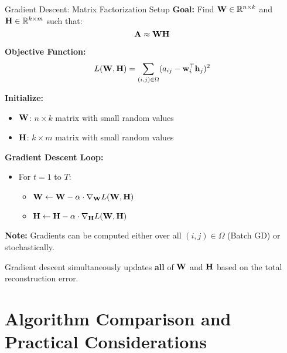 \documentclass{beamer}
\begin{document}
\begin{frame}{Gradient Descent: Matrix Factorization Setup}
\textbf{Goal:} Find $\mathbf{W} \in \mathbb{R}^{n \times k}$ and $\mathbf{H} \in \mathbb{R}^{k \times m}$ such that:
\[
\mathbf{A} \approx \mathbf{W} \mathbf{H}
\]

\vspace{0.5em}
\textbf{Objective Function:}
\[
L(\mathbf{W}, \mathbf{H}) = \sum_{(i,j) \in \Omega} (a_{ij} - \mathbf{w}_i^\top \mathbf{h}_j)^2
\]

\pause
\textbf{Initialize:}
\begin{itemize}
  \item $\mathbf{W}$: $n \times k$ matrix with small random values
  \item $\mathbf{H}$: $k \times m$ matrix with small random values
\end{itemize}

\pause
\textbf{Gradient Descent Loop:}
\begin{itemize}
  \item For $t = 1$ to $T$:
  \begin{itemize}
    \item $\mathbf{W} \leftarrow \mathbf{W} - \alpha \cdot \nabla_{\mathbf{W}} L(\mathbf{W}, \mathbf{H})$
    \item $\mathbf{H} \leftarrow \mathbf{H} - \alpha \cdot \nabla_{\mathbf{H}} L(\mathbf{W}, \mathbf{H})$
  \end{itemize}
\end{itemize}

\pause
\textbf{Note:} Gradients can be computed either over all $(i,j) \in \Omega$ (Batch GD) or stochastically.

\begin{keypointsbox}{}
Gradient descent simultaneously updates \textbf{all} of $\mathbf{W}$ and $\mathbf{H}$ based on the total reconstruction error.
\end{keypointsbox}
\end{frame}



\section{Algorithm Comparison and Practical Considerations}
\end{document}

